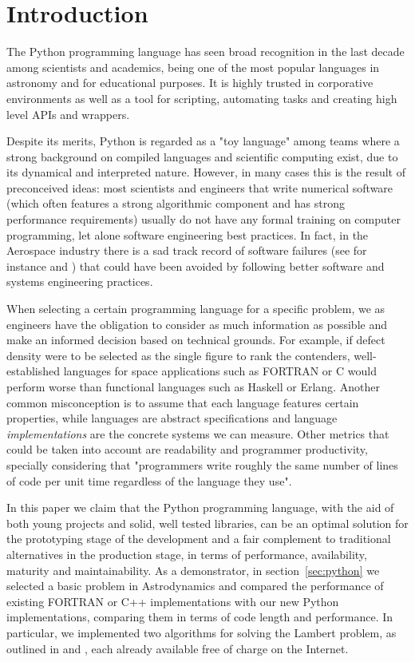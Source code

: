 \section{Introduction}
\label{sec:intro}

The Python programming language has seen broad recognition in the last decade among scientists and academics, being one of the most popular languages in astronomy\citep{Robitaille2013} and for educational purposes\citep{guo2014python}. It is highly trusted in corporative environments as well as a tool for scripting, automating tasks and creating high level APIs and wrappers.

Despite its merits, Python is regarded as a "toy language" among teams where a strong background on compiled languages and scientific computing exist, due to its dynamical and interpreted nature. However, in many cases this is the result of preconceived ideas: most scientists and engineers that write numerical software (which often features a strong algorithmic component and has strong performance requirements) usually do not have any formal training on computer programming, let alone software engineering best practices\citep{Wilson2014}. In fact, in the Aerospace industry there is a sad track record of software failures (see for instance \citep{albee2000report} and \citep{lions1996report}) that could have been avoided by following better software and systems engineering practices.

When selecting a certain programming language for a specific problem, we as engineers have the obligation to consider as much information as possible and make an informed decision based on technical grounds. For example, if defect density were to be selected as the single figure to rank the contenders, well-established languages for space applications such as FORTRAN or C would perform worse than functional languages such as Haskell or Erlang\citep{Ray2014}. Another common misconception is to assume that each language features certain properties, while languages are abstract specifications and language \textit{implementations} are the concrete systems we can measure. Other metrics that could be taken into account are readability and programmer productivity, specially considering that "programmers write roughly the same number of lines of code per unit time regardless of the language they use"\citep{Wilson2014}.

In this paper we claim that the Python programming language, with the aid of both young projects and solid, well tested libraries, can be an optimal solution for the prototyping stage of the development and a fair complement to traditional alternatives in the production stage, in terms of performance, availability, maturity and maintainability. As a demonstrator, in section~\ref{sec:python} we selected a basic problem in Astrodynamics and compared the performance of existing FORTRAN or C++ implementations with our new Python implementations, comparing them in terms of code length and performance. In particular, we implemented two algorithms for solving the Lambert problem, as outlined in \citep{vallado2001fundamentals} and \citep{Izzo2014}, each already available free of charge on the Internet.

